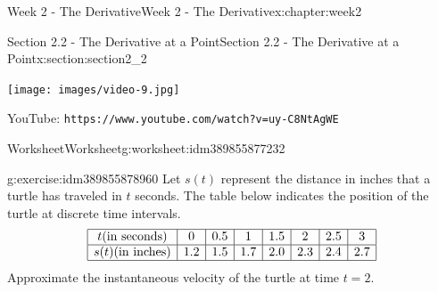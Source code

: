 \documentclass[oneside,10pt,]{book}
\newcommand{\mono}[1]{\texttt{#1}}
\numberwithin{equation}{section}
\newlength{\qrsize}
\newlength{\previewwidth}
\begin{document}
\begin{chapterptx}{Week 2 - The Derivative}{}{Week 2 - The Derivative}{}{}{x:chapter:week2}
%
%
\typeout{************************************************}
\typeout{************************************************}
%
\begin{sectionptx}{Section 2.2 - The Derivative at a Point}{}{Section 2.2 - The Derivative at a Point}{}{}{x:section:section2_2}
\setlength{\qrsize}{9em}
\setlength{\previewwidth}{\linewidth}
\addtolength{\previewwidth}{-\qrsize}
\begin{tcbraster}[raster columns=2, raster column skip=1pt, raster halign=center, raster force size=false, raster left skip=0pt, raster right skip=0pt]%
\begin{tcolorbox}[previewstyle, width=\previewwidth]%
\texttt{[image: images/video-9.jpg]}%
\end{tcolorbox}%
\begin{tcolorbox}[qrstyle]%
{\hypersetup{urlcolor=black}}%
\end{tcolorbox}%
\begin{tcolorbox}[captionstyle]%
\small YouTube: \mono{https://www.youtube.com/watch?v=uy-C8NtAgWE}\end{tcolorbox}%
\end{tcbraster}%
%
%
\typeout{************************************************}
\typeout{************************************************}
%
\begin{worksheet-subsection}{Worksheet}{}{Worksheet}{}{}{g:worksheet:idm389855877232}
\begin{divisionexercise}{1}{}{}{g:exercise:idm389855878960}%
Let \(s(t)\) represent the distance in inches that a turtle has traveled in \(t\) seconds. The table below indicates the position of the turtle at discrete time intervals.%
\begin{equation*}
\begin{array} {| c | c | c | c | c | c | c | c |}
\hline t \text{(in seconds)}& 0 & 0.5 & 1 & 1.5 & 2 & 2.5 & 3 \\
\hline s(t) \text{(in inches)}& 1.2 & 1.5 & 1.7 & 2.0 & 2.3 & 2.4 & 2.7 \\
\hline
\end{array} 
\end{equation*}
Approximate the instantaneous velocity of the turtle at time \(t=2\).%

\end{divisionexercise}
\end{worksheet-subsection}
\end{sectionptx}
\end{chapterptx}
\end{document}
